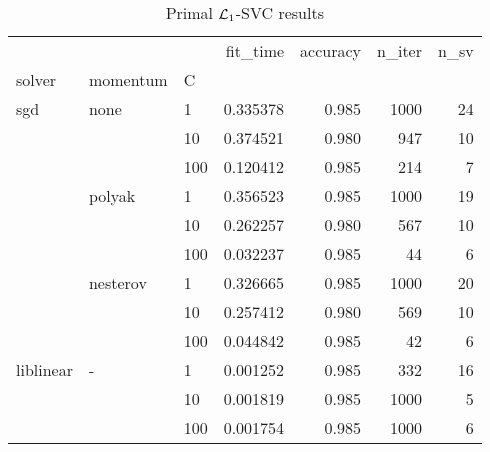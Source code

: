 \begin{table}[H]
\centering
\caption{Primal $\protect \mathcal{L}_1$-SVC results}
\label{primal_l1_svc_cv_results}
\begin{tabular}{lllrrrr}
\toprule
          &   &     &  fit\_time &  accuracy &  n\_iter &  n\_sv \\
solver & momentum & C &           &           &         &       \\
\midrule
sgd & none & 1   &  0.335378 &     0.985 &    1000 &    24 \\
          &   & 10  &  0.374521 &     0.980 &     947 &    10 \\
          &   & 100 &  0.120412 &     0.985 &     214 &     7 \\
          & polyak & 1   &  0.356523 &     0.985 &    1000 &    19 \\
          &   & 10  &  0.262257 &     0.980 &     567 &    10 \\
          &   & 100 &  0.032237 &     0.985 &      44 &     6 \\
          & nesterov & 1   &  0.326665 &     0.985 &    1000 &    20 \\
          &   & 10  &  0.257412 &     0.980 &     569 &    10 \\
          &   & 100 &  0.044842 &     0.985 &      42 &     6 \\
liblinear & - & 1   &  0.001252 &     0.985 &     332 &    16 \\
          &   & 10  &  0.001819 &     0.985 &    1000 &     5 \\
          &   & 100 &  0.001754 &     0.985 &    1000 &     6 \\
\bottomrule
\end{tabular}
\end{table}
